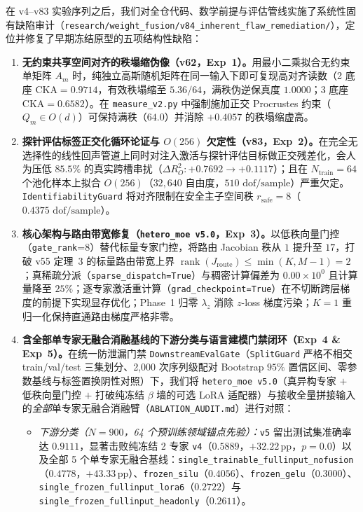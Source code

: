 \documentclass[10pt,twoside]{article}
\theoremstyle{definition}
\theoremstyle{plain}
\theoremstyle{remark}
\begin{document}
在 v4--v83 实验序列之后，我们对全仓代码、数学前提与评估管线实施了系统性固有缺陷审计（\texttt{research/weight\_fusion/v84\_inherent\_flaw\_remediation/}），定位并修复了早期冻结原型的五项结构性缺陷：

\begin{enumerate}[leftmargin=1.6em, itemsep=1pt, parsep=0pt]
    \item \textbf{无约束共享空间对齐的秩塌缩伪像（v62，Exp~1）。}用最小二乘拟合无约束单矩阵 $A_m$ 时，纯独立高斯随机矩阵在同一输入下即可复现高对齐读数（2 底座 $\mathrm{CKA}=0.9714$，有效秩塌缩至 $5.36/64$，满秩伪逆保真度 $1.0000$；3 底座 $\mathrm{CKA}=0.6582$）。在 \texttt{measure\_v2.py} 中强制施加正交 Procrustes 约束（$Q_m \in O(d)$）可保持满秩（$64.0$）并消除 $+0.4057$ 的秩塌缩虚高。
    \item \textbf{探针评估标签正交化循环论证与 $O(256)$ 欠定性（v83，Exp~2）。}在完全无选择性的线性回声管道上同时对注入激活与探针评估目标做正交残差化，会人为压低 $85.5\%$ 的真实跨槽串扰（$\Delta R^2_O: +0.7692 \to +0.1117$）；且在 $N_{\text{train}}{=}64$ 个池化样本上拟合 $O(256)$（$32{,}640$ 自由度，$510\text{ dof/sample}$）严重欠定。\texttt{IdentifiabilityGuard} 将对齐限制在安全主子空间秩 $r_{\text{safe}}{=}8$（$0.4375\text{ dof/sample}$）。
    \item \textbf{核心架构与路由带宽修复（\texttt{hetero\_moe v5.0}，Exp~3）。}以低秩向量门控（\texttt{gate\_rank}=8）替代标量专家门控，将路由 Jacobian 秩从 $1$ 提升至 $17$，打破 v55 定理~3 的标量路由带宽上界 $\operatorname{rank}(J_{\text{route}}) \le \min(K, M-1)=2$；真稀疏分派（\texttt{sparse\_dispatch=True}）与稠密计算偏差为 $0.00\times 10^0$ 且计算量降至 $25\%$；逐专家激活重计算（\texttt{grad\_checkpoint=True}）在不切断跨层梯度的前提下实现显存优化；Phase~1 归零 $\lambda_z$ 消除 $z$-loss 梯度污染；$K{=}1$ 重归一化保持直通路由梯度严格非零。
    \item \textbf{含全部单专家无融合消融基线的下游分类与语言建模门禁闭环（Exp~4 \& Exp~5）。}在统一防泄漏门禁 \texttt{DownstreamEvalGate}（\texttt{SplitGuard} 严格不相交 train/val/test 三集划分、2{,}000 次序列级配对 Bootstrap $95\%$ 置信区间、零参数基线与标签置换阴性对照）下，我们将 \texttt{hetero\_moe v5.0}（真异构专家 $+$ 低秩向量门控 $+$ 打破纯冻结 $\beta$ 墙的可选 LoRA 适配器）与接收全量拼接输入的\emph{全部}单专家无融合消融臂（\texttt{ABLATION\_AUDIT.md}）进行对照：
    \begin{itemize}[leftmargin=1.4em, itemsep=0.5pt, parsep=0pt]
        \item \emph{下游分类（$N{=}900$，64 个预训练领域锚点先验）：}\texttt{v5} 留出测试集准确率达 $\mathbf{0.9111}$，显著击败纯冻结 2 专家 \texttt{v4}（$0.5889$，$+32.22\,\text{pp}$，$p{=}0.0$）以及全部 5 个单专家无融合基线：\texttt{single\_trainable\_fullinput\_nofusion}（$0.4778$，$+43.33\,\text{pp}$）、\texttt{frozen\_silu}（$0.4056$）、\texttt{frozen\_gelu}（$0.3000$）、\texttt{single\_frozen\_fullinput\_lora6}（$0.2722$）与 \texttt{single\_frozen\_fullinput\_headonly}（$0.2611$）。

\end{itemize}
\end{enumerate}
\end{document}
